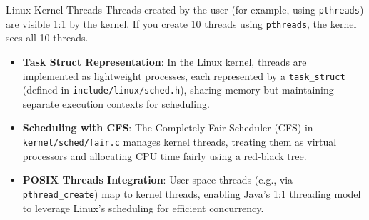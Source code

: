 \begin{frame}{Linux Kernel Threads}
  Threads created by the user (for example, using \texttt{pthreads}) are visible 1:1 by the kernel.
  If you create 10 threads using \texttt{pthreads}, the kernel
  sees all 10 threads.
  \begin{itemize}
    \item \textbf{Task Struct Representation}: In the Linux kernel, threads are implemented as lightweight processes, each represented by a \texttt{task\_struct} (defined in \texttt{include/linux/sched.h}), sharing memory but maintaining separate execution contexts for scheduling.
    \item \textbf{Scheduling with CFS}: The Completely Fair Scheduler (CFS) in \texttt{kernel/sched/fair.c} manages kernel threads, treating them as virtual processors and allocating CPU time fairly using a red-black tree.
    \item \textbf{POSIX Threads Integration}: User-space threads (e.g., via \texttt{pthread\_create}) map to kernel threads, enabling Java’s 1:1 threading model to leverage Linux’s scheduling for efficient concurrency.
  \end{itemize}
\end{frame}


